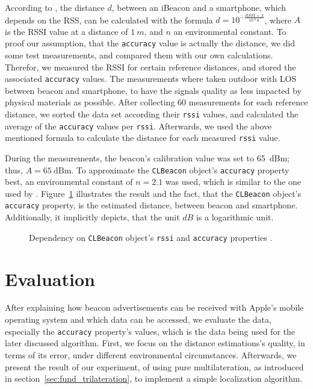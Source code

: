 According to \citet{wang:bt_pos}, the distance $d$, between an iBeacon and a smartphone, which depends on the \acl{RSS}, can be calculated with the formula $d = 10^{-\frac{RSSI + A}{10 * n}}$, where $A$ is the \acs{RSSI} value at a distance of $1~m$, and $n$ an environmental constant. To proof our assumption, that the \texttt{accuracy} value is actually the distance, we did some test measurements, and compared them with our own calculations. Therefor, we measured the \acs{RSSI} for certain reference distances, and stored the associated \texttt{accuracy} values. The measurements where taken outdoor with \ac{LOS} between beacon and smartphone, to have the signals quality as less impacted by physical materials as possible. After collecting 60 measurements for each reference distance, we sorted the data set according their \texttt{rssi} values, and calculated the average of the \texttt{accuracy} values per \texttt{rssi}. Afterwards, we used the above mentioned formula to calculate the distance for each measured \texttt{rssi} value.

During the measurements, the beacon's calibration value was set to 65~dBm; thus, $A = 65~\text{dBm}$. To approximate the \texttt{CLBeacon} object's \texttt{accuracy} property best, an environmental constant of $n = 2.1$ was used, which is similar to the one used by \citet{wang:bt_pos}. Figure~\ref{fig:eval_accuracy_vs_distance} illustrates the result and the fact, that the \texttt{CLBeacon} object's \texttt{accuracy} property, is the estimated distance, between beacon and smartphone. Additionally, it implicitly depicts, that the unit $dB$ is a logarithmic unit.

\begin{figure}
  
	\caption{Dependency on \texttt{CLBeacon} object's \texttt{rssi} and \texttt{accuracy} properties \citep{apple:ios_doc_cl,wang:bt_pos,kotanen:exp_local_pos_bt}.}
	\label{fig:eval_accuracy_vs_distance}
\end{figure}



\section{Evaluation}\label{sec:beacon_eval}
After explaining how beacon advertisements can be received with Apple's mobile operating system and which data can be accessed, we evaluate the data, especially the \texttt{accuracy} property's values, which is the data being used for the later discussed algorithm. First, we focus on the distance estimations's quality, in terms of its error, under different environmental circumstances. Afterwards, we present the result of our experiment, of using pure multilateration, as introduced in section~\ref{sec:fund_trilateration}, to implement a simple localization algorithm.

